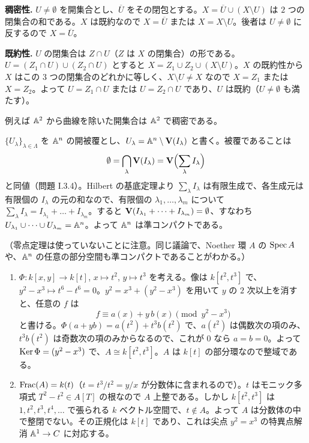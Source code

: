 \textbf{稠密性.} $U\neq\emptyset$ を開集合とし、$\overline{U}$ をその閉包とする。$X=\overline{U}\cup(X\setminus U)$ は $2$ つの閉集合の和である。$X$ は既約なので $X=\overline{U}$ または $X=X\setminus U$。後者は $U\neq\emptyset$ に反するので $X=\overline{U}$。

\textbf{既約性.} $U$ の閉集合は $Z\cap U$（$Z$ は $X$ の閉集合）の形である。$U=(Z_1\cap U)\cup(Z_2\cap U)$ とすると $X=Z_1\cup Z_2\cup(X\setminus U)$。$X$ の既約性から $X$ はこの $3$ つの閉集合のどれかに等しく、$X\setminus U\neq X$ なので $X=Z_1$ または $X=Z_2$。よって $U=Z_1\cap U$ または $U=Z_2\cap U$ であり、$U$ は既約（$U\neq\emptyset$ も満たす）。

例えば $\mathbb{A}^2$ から曲線を除いた開集合は $\mathbb{A}^2$ で稠密である。

$\{U_\lambda\}_{\lambda\in\Lambda}$ を $\mathbb{A}^n$ の開被覆とし、$U_\lambda=\mathbb{A}^n\setminus\mathbf{V}(I_\lambda)$ と書く。被覆であることは
\[
  \emptyset=\bigcap_\lambda\mathbf{V}(I_\lambda)=\mathbf{V}\Bigl(\sum_\lambda I_\lambda\Bigr)
\]
と同値（問題 I.3.4）。Hilbert の基底定理より $\sum_\lambda I_\lambda$ は有限生成で、各生成元は有限個の $I_\lambda$ の元の和なので、有限個の $\lambda_1,\dots,\lambda_m$ について $\sum_\lambda I_\lambda=I_{\lambda_1}+\dots+I_{\lambda_m}$。すると $\mathbf{V}(I_{\lambda_1}+\dots+I_{\lambda_m})=\emptyset$、すなわち $U_{\lambda_1}\cup\dots\cup U_{\lambda_m}=\mathbb{A}^n$。よって $\mathbb{A}^n$ は準コンパクトである。

（零点定理は使っていないことに注意。同じ議論で、Noether 環 $A$ の $\operatorname{Spec} A$ や、$\mathbb{A}^n$ の任意の部分空間も準コンパクトであることがわかる。）

\begin{enumerate}
  \item $\Phi:k[x,y]\to k[t]$, $x\mapsto t^2$, $y\mapsto t^3$ を考える。像は $k[t^2,t^3]$ で、$y^2-x^3\mapsto t^6-t^6=0$。$y^2=x^3+(y^2-x^3)$ を用いて $y$ の $2$ 次以上を消すと、任意の $f$ は
  \[
    f\equiv a(x)+y\,b(x)\pmod{y^2-x^3}
  \]
  と書ける。$\Phi(a+yb)=a(t^2)+t^3b(t^2)$ で、$a(t^2)$ は偶数次の項のみ、$t^3b(t^2)$ は奇数次の項のみからなるので、これが $0$ なら $a=b=0$。よって $\operatorname{Ker}\Phi=(y^2-x^3)$ で、$A\cong k[t^2,t^3]$。$A$ は $k[t]$ の部分環なので整域である。
  \item $\operatorname{Frac}(A)=k(t)$（$t=t^3/t^2=y/x$ が分数体に含まれるので）。$t$ はモニック多項式 $T^2-t^2\in A[T]$ の根なので $A$ 上整である。しかし $k[t^2,t^3]$ は $1,t^2,t^3,t^4,\dots$ で張られる $k$ ベクトル空間で、$t\notin A$。よって $A$ は分数体の中で整閉でない。その正規化は $k[t]$ であり、これは尖点 $y^2=x^3$ の特異点解消 $\mathbb{A}^1\to C$ に対応する。
\end{enumerate}

